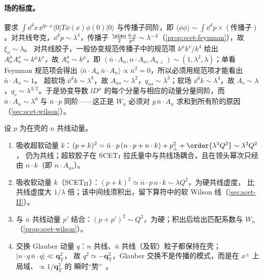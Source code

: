 \paragraph{场的标度。}
要求 $\int\dd^4x\,\ee^{\ii p\cdot x}\langle0|T\phi(x)\phi(0)|0\rangle$ 与传播子同阶，即
$\langle\phi\phi\rangle\sim\int\dd^4p\times(\text{传播子})$。对共线夸克，$\dd^4p\sim\lambda^4$，传播子
$\frac{\nslash}{2}\frac{\bar n\cdot p}{p^2}\sim\lambda^{-2}$（\cref{prop:scet-feynman}），故 $\xi_n\sim\lambda$。
对共线胶子，一般协变规范传播子中的规范项 $k^\mu k^\nu/k^4$ 给出 $A_n^\mu A_n^\nu\sim k^\mu k^\nu$，故
$A_n^\mu\sim k^\mu$，即 $(\bar n\cdot A_n,n\cdot A_n,A_{n\perp})\sim(1,\lambda^2,\lambda)$；单看 Feynman 规范项会得出
$\langle\bar n\cdot A_n\,\bar n\cdot A_n\rangle\propto\bar n^2=0$，所以必须用规范项才能看出 $\bar n\cdot A_n\sim1$。
超软场 $\dd^4k\sim\lambda^8$，故 $A_{us}\sim\lambda^2$，$q_{us}\sim\lambda^3$；软场 $\dd^4k\sim\lambda^4$，故
$A_s\sim\lambda$，$q_s\sim\lambda^{3/2}$。于是协变导数 $\ii D^\mu$ 的每个分量与相应的动量分量同阶，而
$\bar n\cdot A_n\sim\lambda^0$ 与 $\bar n\cdot p$ 同阶——这正是 $W_n$ 必须对 $g\,\bar n\cdot A_n$ 求和到所有阶的原因
（\cref{sec:scet-wilson}）。

\begin{proposition}[模式之间的相互作用]\tagR\label{prop:scet-interactions}
设 $p$ 为在壳的 $n$ 共线动量。
\begin{enumerate}[label=(\roman*)]
\item 吸收超软动量 $k$：$(p+k)^2=\bar n\cdot p\,(n\cdot p+n\cdot k)+p_\perp^2+\order{\lambda^3Q^2}\sim\lambda^2Q^2$，
仍为共线；超软胶子在 SCET$_{\rm I}$ 拉氏量中与共线场耦合，且在领头幂次只经由 $n\cdot k$（即 $n\cdot A_{us}$）。
\item 吸收软动量 $k$（SCET$_{\rm II}$）：$(p+k)^2\simeq\bar n\cdot p\,n\cdot k\sim\lambda Q^2$，为硬共线虚度，
比共线虚度大 $1/\lambda$ 倍；该中间线须积出，留下算符中的软 Wilson 线（\cref{sec:scet-II}）。
\item 与 $\bar n$ 共线动量 $p'$ 结合：$(p+p')^2\sim Q^2$，为硬；积出后给出匹配系数与 $W_n$（\cref{prop:scet-wilson}）。
\item 交换 Glauber 动量 $q$：$n$ 共线、$\bar n$ 共线（及软）粒子都保持在壳；$|n\cdot q\,\bar n\cdot q|\ll\bm q_{\mathrm T}^2$，
故 $q^2\simeq-\bm q_{\mathrm T}^2$，Glauber 交换不是传播的模式，而是在 $x^\pm$ 上局域、$\propto1/\bm q_{\mathrm T}^2$ 的
瞬时“势”~\cite{RothsteinStewart2016}。
\end{enumerate}
\end{proposition}

